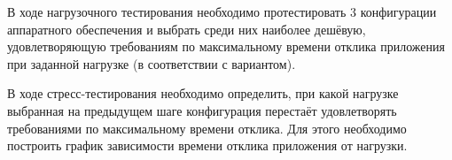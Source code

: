 \documentclass[12pt,onecolumn]{article}
\begin{document}
В ходе нагрузочного тестирования необходимо протестировать 3 конфигурации аппаратного обеспечения и выбрать среди них наиболее дешёвую, удовлетворяющую требованиям по максимальному времени отклика приложения при заданной нагрузке (в соответствии с вариантом).

В ходе стресс-тестирования необходимо определить, при какой нагрузке выбранная на предыдущем шаге конфигурация перестаёт удовлетворять требованиями по максимальному времени отклика. Для этого необходимо построить график зависимости времени отклика приложения от нагрузки.


\begin{center}
\end{center}


\begin{center}
\end{center}


\begin{center}
\end{center}
\end{document}

